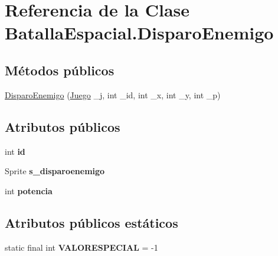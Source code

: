 \hypertarget{classBatallaEspacial_1_1DisparoEnemigo}{
\section{Referencia de la Clase BatallaEspacial.DisparoEnemigo}
\label{classBatallaEspacial_1_1DisparoEnemigo}
}
\subsection*{Métodos públicos}
\begin{DoxyCompactItemize}
\item 
\hyperlink{classBatallaEspacial_1_1DisparoEnemigo_a18d3903cc57df51236ea2d9b8151a3a9}{DisparoEnemigo} (\hyperlink{classBatallaEspacial_1_1Juego}{Juego} \_\-j, int \_\-id, int \_\-x, int \_\-y, int \_\-p)
\end{DoxyCompactItemize}
\subsection*{Atributos públicos}
\begin{DoxyCompactItemize}
\item 
\hypertarget{classBatallaEspacial_1_1DisparoEnemigo_a38f3bce5400ab2d3f4b9d633cabc2708}{
int {\bfseries id}}
\label{classBatallaEspacial_1_1DisparoEnemigo_a38f3bce5400ab2d3f4b9d633cabc2708}

\item 
\hypertarget{classBatallaEspacial_1_1DisparoEnemigo_a5705b22b162bc3f660d6095e099fa6e1}{
Sprite {\bfseries s\_\-disparoenemigo}}
\label{classBatallaEspacial_1_1DisparoEnemigo_a5705b22b162bc3f660d6095e099fa6e1}

\item 
\hypertarget{classBatallaEspacial_1_1DisparoEnemigo_ab8e51083b11f849dd05ee2f38df34799}{
int {\bfseries potencia}}
\label{classBatallaEspacial_1_1DisparoEnemigo_ab8e51083b11f849dd05ee2f38df34799}

\end{DoxyCompactItemize}
\subsection*{Atributos públicos estáticos}
\begin{DoxyCompactItemize}
\item 
\hypertarget{classBatallaEspacial_1_1DisparoEnemigo_ae905809e028829ab0d3c5e93e4175353}{
static final int {\bfseries VALORESPECIAL} = -\/1}
\label{classBatallaEspacial_1_1DisparoEnemigo_ae905809e028829ab0d3c5e93e4175353}

\end{DoxyCompactItemize}

